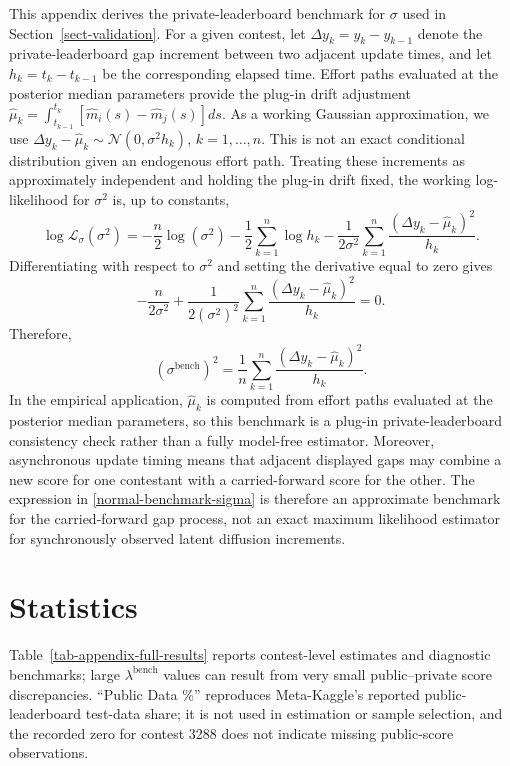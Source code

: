 \documentclass[mnsc]{informs3}
\begin{document}
\begin{APPENDICES}
This appendix derives the private-leaderboard benchmark for $\sigma$ used in Section~\ref{sect-validation}.
For a given contest, let $\Delta y_k=y_k-y_{k-1}$ denote the private-leaderboard gap increment between two adjacent update times, and let $h_k=t_k-t_{k-1}$ be the corresponding elapsed time.
Effort paths evaluated at the posterior median parameters provide the plug-in drift adjustment $\hat\mu_k=\int_{t_{k-1}}^{t_k}\left[\hat m_i(s)-\hat m_j(s)\right]ds$.
As a working Gaussian approximation, we use $\Delta y_k-\hat\mu_k\sim\mathcal N(0,\sigma^2 h_k)$, $k=1,\ldots,n$.
This is not an exact conditional distribution given an endogenous effort path. Treating these increments as approximately independent and holding the plug-in drift fixed, the working log-likelihood for $\sigma^2$ is, up to constants,
\[
\log\mathcal L_{\sigma}(\sigma^2)
=
-\frac{n}{2}\log(\sigma^2)
-\frac{1}{2}\sum_{k=1}^n\log h_k
-\frac{1}{2\sigma^2}\sum_{k=1}^n
\frac{(\Delta y_k-\hat\mu_k)^2}{h_k}.
\]
Differentiating with respect to $\sigma^2$ and setting the derivative equal to zero gives
\[
-\frac{n}{2\sigma^2}
+
\frac{1}{2(\sigma^2)^2}
\sum_{k=1}^n
\frac{(\Delta y_k-\hat\mu_k)^2}{h_k}
=0.
\]
Therefore,
\begin{equation}\label{normal-benchmark-sigma}
(\sigma^{\mathrm{bench}})^2
=
\frac{1}{n}\sum_{k=1}^n
\frac{(\Delta y_k-\hat\mu_k)^2}{h_k}.
\end{equation}
In the empirical application, {$\hat\mu_k$ is computed from effort paths evaluated at the posterior median parameters}, so this benchmark is a plug-in private-leaderboard consistency check rather than a fully model-free estimator. Moreover, asynchronous update timing means that adjacent displayed gaps may combine a new score for one contestant with a carried-forward score for the other. The expression in \eqref{normal-benchmark-sigma} is therefore an approximate benchmark for the carried-forward gap process, not an exact maximum likelihood estimator for synchronously observed latent diffusion increments.








\section{Statistics}\label{appendix-statistics}

Table~\ref{tab-appendix-full-results} reports {contest-level estimates and diagnostic benchmarks; large $\lambda^{\mathrm{bench}}$ values can result from very small public--private score discrepancies}.
{``Public Data \%'' reproduces Meta-Kaggle's reported public-leaderboard test-data share; it is not used in estimation or sample selection, and the recorded zero for contest 3288 does not indicate missing public-score observations.}


\end{APPENDICES}
\end{document}
